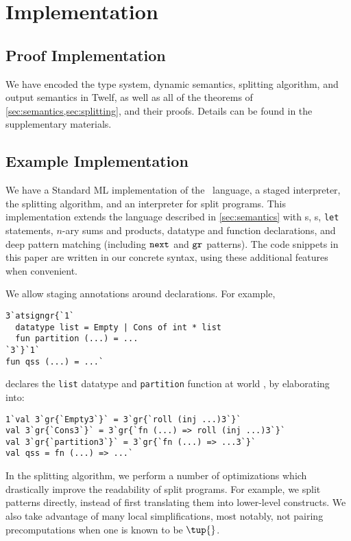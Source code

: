 
\section {Implementation}
\label{sec:implementation}

\subsection {Proof Implementation}

We have encoded the type system, dynamic semantics, splitting algorithm, and output semantics in Twelf,
as well as all of the theorems of \ref{sec:semantics,sec:splitting}, and their proofs. 
Details can be found in the supplementary materials.

\subsection {Example Implementation}

\begin{abstrsyn}
We have a Standard ML implementation of the \lang\ language, a staged
interpreter, the splitting algorithm, and an interpreter for split programs.
This implementation extends the language described in \ref{sec:semantics} with 
\rmint{}s,
\rmbool{}s,
\texttt{let} statements,
$n$-ary sums and products,
datatype and function declarations, and
deep pattern matching (including ${\tt next}{}$ and ${\tt gr}{}$ patterns).
The code snippets in this paper are written in our concrete syntax, using 
these additional features when convenient.

We allow staging annotations around declarations. For example,
\begin{lstlisting}
3`atsigngr{`1`
  datatype list = Empty | Cons of int * list
  fun partition (...) = ...
`3`}`1`
fun qss (...) = ...`
\end{lstlisting}
declares the \texttt{list} datatype and \texttt{partition} function at world \bbonep,
by elaborating into:
\begin{lstlisting}
1`val 3`gr{`Empty3`}` = 3`gr{`roll (inj ...)3`}`
val 3`gr{`Cons3`}` = 3`gr{`fn (...) => roll (inj ...)3`}`
val 3`gr{`partition3`}` = 3`gr{`fn (...) => ...3`}`
val qss = fn (...) => ...`
\end{lstlisting}

In the splitting algorithm, we perform a number of optimizations which
drastically improve the readability of split programs. For example, we split
patterns directly, instead of first translating them into lower-level
constructs. We also take advantage of many local simplifications, most notably,
not pairing precomputations when one is known to be $\tup{}$.




\end{abstrsyn}
